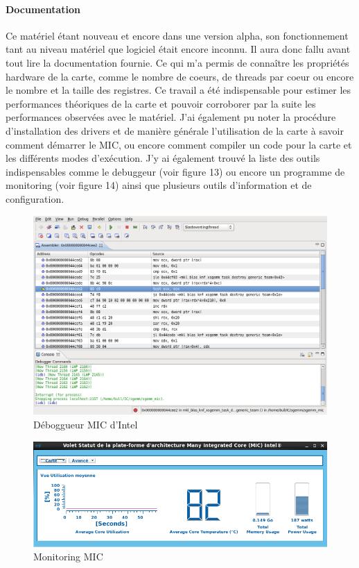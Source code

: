 \documentclass{article}
\begin{document}
				\paragraph{Documentation}
				Ce matériel étant nouveau et encore dans une version alpha, son fonctionnement tant au niveau matériel que
				logiciel était encore inconnu. Il aura donc fallu avant tout lire la documentation fournie. Ce qui m'a permis de 
				connaître les propriétés hardware de la carte, comme le nombre de coeurs, de threads par coeur ou encore le 
				nombre et la taille des registres. Ce travail a été indispensable pour estimer les performances théoriques de la carte 
				et pouvoir corroborer par la suite les performances observées avec le matériel. \newline
				J'ai également pu noter la procédure d'installation des drivers et de manière générale l'utilisation
				de la carte à savoir comment démarrer le MIC, ou encore comment compiler un code pour la carte et les 
				différents modes d'exécution. \newline
				J'y ai également trouvé la liste des outils indispensables comme le debuggeur (voir figure 13) ou encore un programme de
				monitoring (voir figure 14) ainsi que plusieurs outils d'information et de configuration.
				\begin{figure}
				\begin{center}
				\includegraphics[scale=0.4]{Intel-Debugger.png}
				\caption{Déboggueur MIC d'Intel}
				\end{center}
				\end{figure}
				\begin{figure}
				\begin{center}
				\includegraphics[scale=0.40]{monitor_mic.png}
				\caption{Monitoring MIC}
				\end{center}
				\end{figure}
\end{document}
